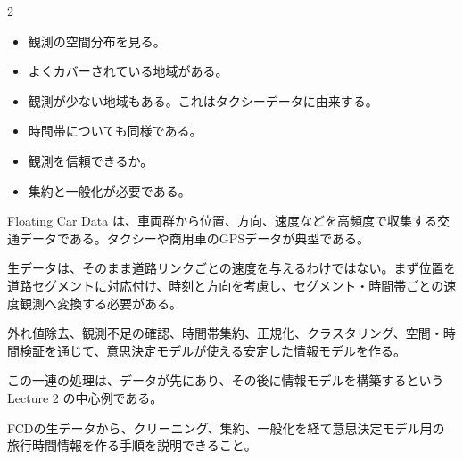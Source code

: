 \begin{multicols}{2}

\footnotesize

\raggedcolumns


\begin{itemize}
\item 観測の空間分布を見る。
\item よくカバーされている地域がある。
\item 観測が少ない地域もある。これはタクシーデータに由来する。
\item 時間帯についても同様である。
\item 観測を信頼できるか。
\item 集約と一般化が必要である。
\end{itemize}

Floating Car Data は、車両群から位置、方向、速度などを高頻度で収集する交通データである。タクシーや商用車のGPSデータが典型である。\par

生データは、そのまま道路リンクごとの速度を与えるわけではない。まず位置を道路セグメントに対応付け、時刻と方向を考慮し、セグメント・時間帯ごとの速度観測へ変換する必要がある。\par

外れ値除去、観測不足の確認、時間帯集約、正規化、クラスタリング、空間・時間検証を通じて、意思決定モデルが使える安定した情報モデルを作る。\par

この一連の処理は、データが先にあり、その後に情報モデルを構築するという Lecture 2 の中心例である。\par

FCDの生データから、クリーニング、集約、一般化を経て意思決定モデル用の旅行時間情報を作る手順を説明できること。\par



\end{multicols}
